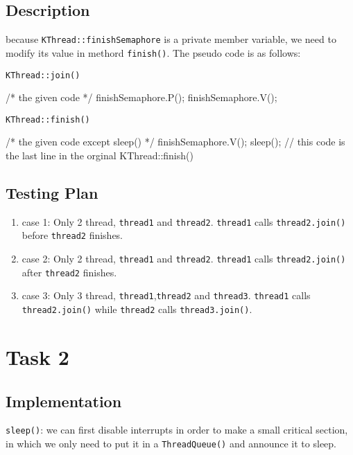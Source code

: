 \documentclass{article}
\begin{document}
\begin{spacing}{1.1}
    \subsection{Description}
    because \texttt{KThread::finishSemaphore} is a private
    member variable, we need to modify its value in methord \texttt{finish()}.
    The pseudo code is as follows:
    \begin{algorithm}[htbp]
      \caption{\texttt{KThread::join()}}
      \begin{algorithmic}[1]
	\STATE /* the given code */
	\STATE finishSemaphore.P();
	\STATE finishSemaphore.V();
      \end{algorithmic}
    \end{algorithm}

    \begin{algorithm}[htbp]
      \caption{\texttt{KThread::finish()}}
      \begin{algorithmic}[1]
	\STATE /* the given code except sleep() */
	\STATE finishSemaphore.V();
	\STATE sleep(); // this code is the last line in the orginal KThread::finish()
      \end{algorithmic}
    \end{algorithm}

    \subsection{Testing Plan}
    \begin{enumerate}
      \item[] case 1: Only 2 thread, \texttt{thread1} and \texttt{thread2}.
	\texttt{thread1} calls \texttt{thread2.join()} before \texttt{thread2} finishes.
      \item[] case 2: Only 2 thread, \texttt{thread1} and \texttt{thread2}.
	\texttt{thread1} calls \texttt{thread2.join()} after \texttt{thread2} finishes.
      \item[] case 3: Only 3 thread, \texttt{thread1},\texttt{thread2} and
	\texttt{thread3}. \texttt{thread1} calls \texttt{thread2.join()} while
	\texttt{thread2} calls \texttt{thread3.join()}.
    \end{enumerate}
    \section{Task 2}
    \subsection{Implementation}
    \texttt{sleep()}: we can first disable interrupts in order to make a small critical section, in which we only need to put it in a \texttt{ThreadQueue()} and announce it to sleep.


\end{spacing}
\end{document}
